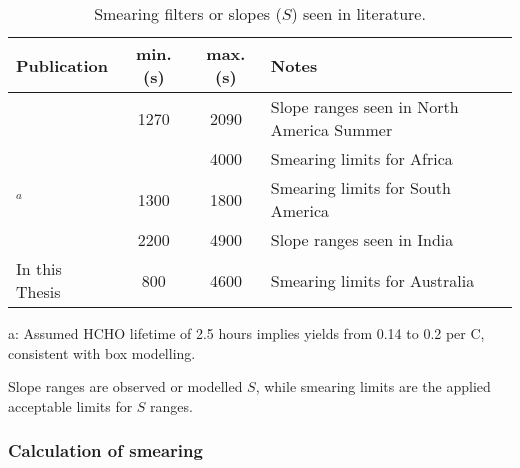     \begin{table}\begin{threeparttable}
      \caption{Smearing filters or slopes ($S$) seen in literature.}
      \begin{tabular}{ l | c  c  >{\centering\arraybackslash}p{5cm} } 
        \toprule
        Publication & min. (s) & max. (s) & Notes \\
        \midrule
        \textcite{Palmer2003}      & 1270 & 2090 & Slope ranges seen in North America Summer \\
        \textcite{Marais2012}      &      & 4000 & Smearing limits for Africa \\
        \textcite{Barkley2013}$^a$ & 1300 & 1800 & Smearing limits for South America \\
        \textcite{Surl2018}        & 2200 & 4900 & Slope ranges seen in India \\
        In this Thesis             & 800  & 4600 & Smearing limits for Australia \\
        
        \bottomrule
      \end{tabular}
      \begin{tablenotes} 
        \item a: Assumed HCHO lifetime of 2.5 hours implies yields from 0.14 to 0.2 per C, consistent with box modelling.
        \item Slope ranges are observed or modelled $S$, while smearing limits are the applied acceptable limits for $S$ ranges. 
      \end{tablenotes}
      \label{BioIsop:method:smearing:tab_smearing_ranges}
    \end{threeparttable}\end{table}
    
    
    
    \subsubsection{Calculation of smearing}
      \label{BioIsop:method:smearing:calculation}
      
